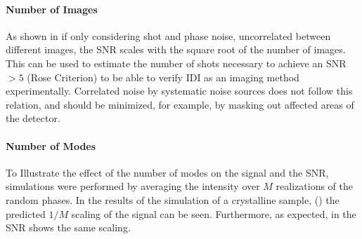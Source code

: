 \paragraph{Number of Images}
As shown in  if only considering shot and phase noise, uncorrelated between different  images, the SNR scales with the square root of the number of images.  This can be used to estimate the number of shots necessary to achieve an SNR $>5$ (Rose Criterion) to be able to verify IDI as an imaging method experimentally. Correlated noise by systematic noise sources does not follow this relation, and should be minimized, for example, by masking out affected areas of the detector.

\paragraph{Number of Modes}
To Illustrate the effect of the number of modes on the signal and the SNR, simulations were performed by averaging the intensity over $M$ realizations of the random phases.  In the results of the simulation of a crystalline sample, () the predicted $1/M$ scaling of the signal can be seen. Furthermore, as expected, in  the SNR shows the same scaling.


